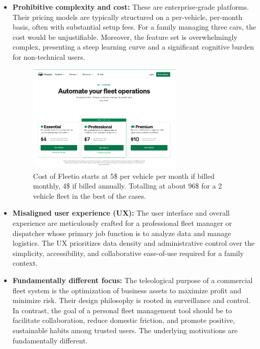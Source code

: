 \begin{itemize}
    \item \textbf{Prohibitive complexity and cost:} These are enterprise-grade platforms. Their pricing models are typically structured on a per-vehicle, per-month basis, often with substantial setup fees. For a family managing three cars, the cost would be unjustifiable. Moreover, the feature set is overwhelmingly complex, presenting a steep learning curve and a significant cognitive burden for non-technical users.

    \begin{figure}[H]
        \centering
        \includegraphics[width=0.7\textwidth]{images/background/fleetio-pricing.png}
        \caption{Cost of Fleetio starts at 5\$ per vehicle per month if billed monthly, 4\$ if billed annually. Totalling at about 96\$ for a 2 vehicle fleet in the best of the cases.}
    \end{figure}
    
    \textgap
    
    \item \textbf{Misaligned user experience (UX):} The user interface and overall experience are meticulously crafted for a professional fleet manager or dispatcher whose primary job function is to analyze data and manage logistics. The UX prioritizes data density and administrative control over the simplicity, accessibility, and collaborative ease-of-use required for a family context.
    
    \textgap
    
    \item \textbf{Fundamentally different focus:} The teleological purpose of a commercial fleet system is the optimization of business assets to maximize profit and minimize risk. Their design philosophy is rooted in surveillance and control. In contrast, the goal of a personal fleet management tool should be to facilitate collaboration, reduce domestic friction, and promote positive, sustainable habits among trusted users. The underlying motivations are fundamentally different.


\end{itemize}
